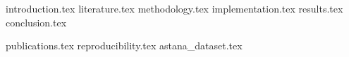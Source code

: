 

\mainmatter
{introduction.tex}
{literature.tex}
{methodology.tex}
{implementation.tex}
{results.tex}
{conclusion.tex}

\appendix
{publications.tex}
{reproducibility.tex}
{astana_dataset.tex}

\backmatter


\clearemptydoublepage
